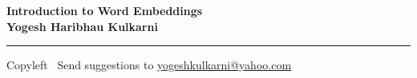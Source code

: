 
\graphicspath{{images/}}

\footnotesize


\begin{center}
\Large{\textbf{Introduction to Word Embeddings\\ Yogesh Haribhau Kulkarni}}  
\end{center}

\begin{multicols}{2}


\end{multicols}

\rule{\linewidth}{0.25pt}
\scriptsize
Copyleft \textcopyleft\  Send suggestions to 
\href{http://yati.io}{yogeshkulkarni@yahoo.com}


